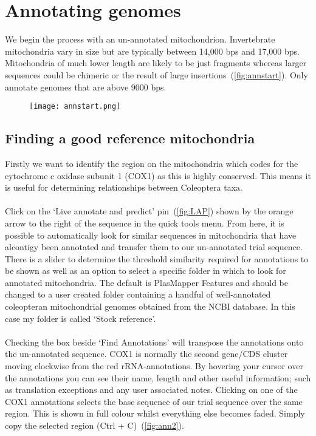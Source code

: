 \documentclass[11pt]{article}
\begin{document}
\newpage
\section{Annotating genomes}
\label{sec:Annotating}
We begin the process with an un-annotated mitochondrion. Invertebrate mitochondria vary in size but are typically between 14,000 bps and 17,000 bps. Mitochondria of much lower length are likely to be just fragments whereas larger sequences could be chimeric or the result of large insertions~(\autoref{fig:annstart}). Only annotate genomes that are above 9000 bps.

\begin{figure}[H]
  \centering
    \texttt{[image: annstart.png]}
  \label{fig:annstart}
\end{figure}

\subsection{Finding a good reference mitochondria}
Firstly we want to identify the region on the mitochondria which codes for the cytochrome c oxidase subunit 1 (COX1) as this is highly conserved. This means it is useful for determining relationships between Coleoptera taxa. 
\\
\\
Click on the `Live annotate and predict' pin~(\autoref{fig:LAP}) shown by the orange arrow to the right of the sequence in the quick tools menu. From here, it is possible to automatically look for similar sequences in mitochondria that have alcontigy been annotated and transfer them to our un-annotated trial sequence. There is a slider to determine the threshold similarity required for annotations to be shown as well as an option to select a specific folder in which to look for annotated mitochondria. The default is PlasMapper Features and should be changed to a user created folder containing a handful of well-annotated coleopteran mitochondrial genomes obtained from the NCBI database. In this case my folder is called `Stock reference'. 
\\
\\
Checking the box beside `Find Annotations' will transpose the annotations onto the un-annotated sequence. COX1 is normally the second gene/CDS cluster moving clockwise from the red rRNA-annotations. By hovering your cursor over the annotations you can see their name, length and other useful information; such as translation exceptions and any user associated notes. Clicking on one of the COX1 annotations selects the base sequence of our trial sequence over the same region. This is shown in full colour whilst everything else becomes faded. Simply copy the selected region (Ctrl + C)~(\autoref{fig:ann2}).
\end{document}
